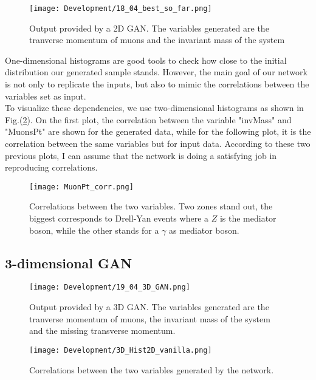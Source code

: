 \begin{figure}[H]
    \centering
    \texttt{[image: Development/18\_04\_best\_so\_far.png]}
    \caption{Output provided by a 2D GAN. The variables generated are the tranverse momentum of muons and the invariant mass of the system}
    \label{2dGAN}
\end{figure}

One-dimensional histograms are good tools to check how close to the initial distribution our generated sample stands. However, the main goal of our network is not only to replicate the inputs, but also to mimic the correlations between the variables set as input.\\
To visualize these dependencies, we use two-dimensional histograms as shown in Fig.(\ref{hist2D}). On the first plot, the correlation between the variable "invMass" and "MuonsPt" are shown for the generated data, while for the following plot, it is the correlation between the same variables but for input data. According to these two previous plots, I can assume that the network is doing a satisfying job in reproducing correlations.\\


\begin{figure}[H]
    \centering
    \texttt{[image: MuonPt\_corr.png]}
    \caption{Correlations between the two variables. Two zones stand out, the biggest corresponds to Drell-Yan events where a $Z$ is the mediator boson, while the other stands for a $\gamma$ as mediator boson.}
    \label{hist2D}
\end{figure}

\subsection{3-dimensional GAN}

\begin{figure}[H]
    \centering
    \texttt{[image: Development/19\_04\_3D\_GAN.png]}
    \caption{Output provided by a 3D GAN. The variables generated are the tranverse momentum of muons, the invariant mass of the system and the missing transverse momentum.}
    \label{fig:enter-label}
\end{figure}

\begin{figure}[H]
    \centering
    \texttt{[image: Development/3D\_Hist2D\_vanilla.png]}
    \caption{Correlations between the two variables generated by the network.}
    \label{fig:enter-label}
\end{figure}


